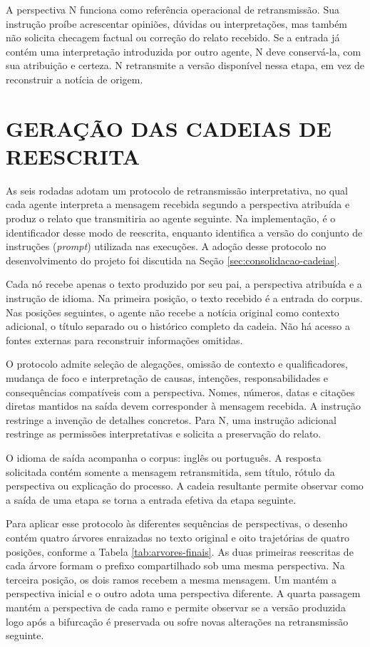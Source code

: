 A perspectiva N funciona como referência operacional de retransmissão. Sua instrução proíbe acrescentar opiniões, dúvidas ou interpretações, mas também não solicita checagem factual ou correção do relato recebido. Se a entrada já contém uma interpretação introduzida por outro agente, N deve conservá-la, com sua atribuição e certeza. N retransmite a versão disponível nessa etapa, em vez de reconstruir a notícia de origem.

\section{GERAÇÃO DAS CADEIAS DE REESCRITA}
\label{sec:metodos-cadeias}

As seis rodadas adotam um protocolo de retransmissão interpretativa, no qual cada agente interpreta a mensagem recebida segundo a perspectiva atribuída e produz o relato que transmitiria ao agente seguinte. Na implementação,  é o identificador desse modo de reescrita, enquanto  identifica a versão do conjunto de instruções (\textit{prompt}) utilizada nas execuções. A adoção desse protocolo no desenvolvimento do projeto foi discutida na Seção \ref{sec:consolidacao-cadeias}.

Cada nó recebe apenas o texto produzido por seu pai, a perspectiva atribuída e a instrução de idioma. Na primeira posição, o texto recebido é a entrada do corpus. Nas posições seguintes, o agente não recebe a notícia original como contexto adicional, o título separado ou o histórico completo da cadeia. Não há acesso a fontes externas para reconstruir informações omitidas.

O protocolo admite seleção de alegações, omissão de contexto e qualificadores, mudança de foco e interpretação de causas, intenções, responsabilidades e consequências compatíveis com a perspectiva. Nomes, números, datas e citações diretas mantidos na saída devem corresponder à mensagem recebida. A instrução restringe a invenção de detalhes concretos. Para N, uma instrução adicional restringe as permissões interpretativas e solicita a preservação do relato.

O idioma de saída acompanha o corpus: inglês ou português. A resposta solicitada contém somente a mensagem retransmitida, sem título, rótulo da perspectiva ou explicação do processo. A cadeia resultante permite observar como a saída de uma etapa se torna a entrada efetiva da etapa seguinte.

Para aplicar esse protocolo às diferentes sequências de perspectivas, o desenho contém quatro árvores enraizadas no texto original e oito trajetórias de quatro posições, conforme a Tabela \ref{tab:arvores-finais}. As duas primeiras reescritas de cada árvore formam o prefixo compartilhado sob uma mesma perspectiva. Na terceira posição, os dois ramos recebem a mesma mensagem. Um mantém a perspectiva inicial e o outro adota uma perspectiva diferente. A quarta passagem mantém a perspectiva de cada ramo e permite observar se a versão produzida logo após a bifurcação é preservada ou sofre novas alterações na retransmissão seguinte.

